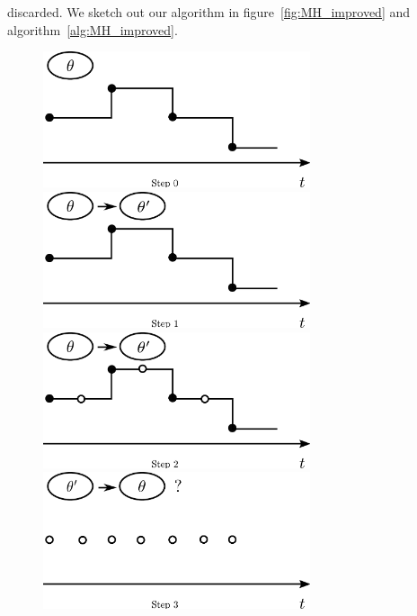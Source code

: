    discarded. We sketch out our algorithm in 
   figure~\ref{fig:MH_improved} and algorithm~\ref{alg:MH_improved}.
\setlength{\unitlength}{0.8cm}
  \begin{figure}[H]
  \centering
  \begin{minipage}[!hp]{0.45\linewidth}
  \centering
    \includegraphics [width=0.70\textwidth, angle=0]{figs/plot0.pdf}
      \end{minipage}
  \begin{minipage}[hp]{0.45\linewidth}
  \centering
    \includegraphics [width=0.70\textwidth, angle=0]{figs/plot1.pdf}
    \vspace{-0 in}
  \end{minipage}
  \begin{minipage}[hp]{0.45\linewidth}
  \centering
    \includegraphics [width=0.70\textwidth, angle=0]{figs/plot2.pdf}
    \vspace{-0 in}
  \end{minipage}
  \begin{minipage}[hp]{0.45\linewidth}
  \centering
    \includegraphics [width=0.70\textwidth, angle=0]{figs/plot3.pdf}

\end{minipage}
\end{figure}
